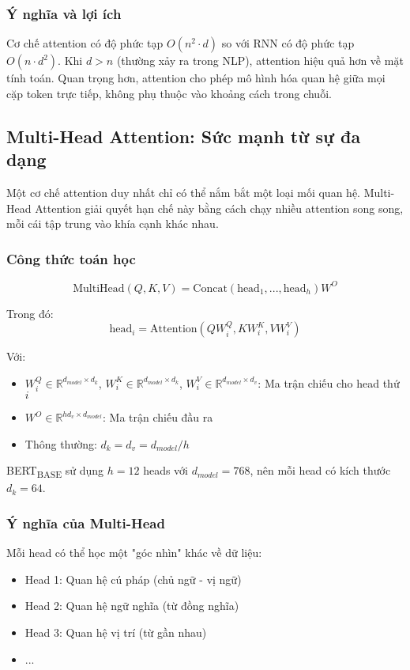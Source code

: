\subsubsection{Ý nghĩa và lợi ích}
Cơ chế attention có độ phức tạp $O(n^2 \cdot d)$ so với RNN có độ phức tạp $O(n \cdot d^2)$. Khi $d > n$ (thường xảy ra trong NLP), attention hiệu quả hơn về mặt tính toán. Quan trọng hơn, attention cho phép mô hình hóa quan hệ giữa mọi cặp token trực tiếp, không phụ thuộc vào khoảng cách trong chuỗi.

\subsection{Multi-Head Attention: Sức mạnh từ sự đa dạng}
\label{ssec:multi_head_attention}

Một cơ chế attention duy nhất chỉ có thể nắm bắt một loại mối quan hệ. Multi-Head Attention giải quyết hạn chế này bằng cách chạy nhiều attention song song, mỗi cái tập trung vào khía cạnh khác nhau.

\subsubsection{Công thức toán học}
\begin{equation}
\text{MultiHead}(Q, K, V) = \text{Concat}(\text{head}_1, ..., \text{head}_h)W^O
\label{eq:multihead}
\end{equation}

Trong đó:
\begin{equation}
\text{head}_i = \text{Attention}(QW_i^Q, KW_i^K, VW_i^V)
\label{eq:head_i}
\end{equation}

Với:
\begin{itemize}
    \item $W_i^Q \in \mathbb{R}^{d_{model} \times d_k}$, $W_i^K \in \mathbb{R}^{d_{model} \times d_k}$, $W_i^V \in \mathbb{R}^{d_{model} \times d_v}$: Ma trận chiếu cho head thứ $i$
    \item $W^O \in \mathbb{R}^{hd_v \times d_{model}}$: Ma trận chiếu đầu ra
    \item Thông thường: $d_k = d_v = d_{model}/h$
\end{itemize}

BERT\textsubscript{BASE} sử dụng $h=12$ heads với $d_{model}=768$, nên mỗi head có kích thước $d_k=64$.

\subsubsection{Ý nghĩa của Multi-Head}
Mỗi head có thể học một "góc nhìn" khác về dữ liệu:
\begin{itemize}
    \item Head 1: Quan hệ cú pháp (chủ ngữ - vị ngữ)
    \item Head 2: Quan hệ ngữ nghĩa (từ đồng nghĩa)
    \item Head 3: Quan hệ vị trí (từ gần nhau)
    \item ...
\end{itemize}

